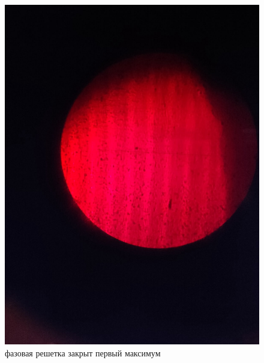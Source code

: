 	\begin{figure}[h!]
		\begin{center}
			\begin{minipage}[h!]{0.48\linewidth}
				\includegraphics[width=1\linewidth]{./images/фазовая_решетка_закрыт_первый_максимум}
				\caption{фазовая решетка закрыт первый максимум}
				\label{2}
			\end{minipage}
			\hfill
			\begin{minipage}[h!]{0.48\linewidth}

\end{minipage}
\end{center}
\end{figure}
